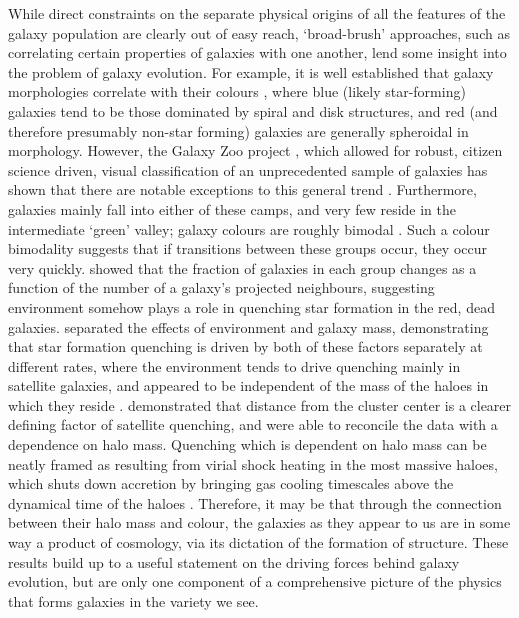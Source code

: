 While direct constraints on the separate physical origins of all the features of the galaxy population are clearly out of easy reach, `broad-brush' approaches, such as correlating certain properties of galaxies with one another, lend some insight into the problem of galaxy evolution. For example, it is well established that galaxy morphologies correlate with their colours \citep[e.g.][]{2001AJ....122.1861S}, where blue (likely star-forming) galaxies tend to be those dominated by spiral and disk structures, and red (and therefore presumably non-star forming) galaxies are generally spheroidal in morphology. However, the Galaxy Zoo project \citep{2008MNRAS.389.1179L,2011MNRAS.410..166L}, which allowed for robust, citizen science driven, visual classification of an unprecedented sample of galaxies has shown that there are notable exceptions to this general trend \citep[ e.g.][]{2009MNRAS.396..818S,2010MNRAS.405..783M}. Furthermore, galaxies mainly fall into either of these camps, and very few reside in the intermediate `green' valley; galaxy colours are roughly bimodal \citep[e.g.][]{2004ApJ...600..681B,2006MNRAS.373..469B}. Such a colour bimodality suggests that if transitions between these groups occur, they occur very quickly. \citet{2006MNRAS.373..469B} showed that the fraction of galaxies in each group changes as a function of the number of a galaxy's projected neighbours, suggesting environment somehow plays a role in quenching star formation in the red, dead galaxies. \citet{2010ApJ...721..193P} separated the effects of environment and galaxy mass, demonstrating that star formation quenching is driven by both of these factors separately at different rates, where the environment tends to drive quenching mainly in satellite galaxies, and appeared to be independent of the mass of the haloes in which they reside \citep{2012ApJ...757....4P}. \citet{2013MNRAS.428.3306W} demonstrated that distance from the cluster center is a clearer defining factor of satellite quenching, and were able to reconcile the data with a dependence on halo mass. Quenching which is dependent on halo mass can be neatly framed as resulting from virial shock heating in the most massive haloes, which shuts down accretion by bringing gas cooling timescales above the dynamical time of the haloes \citep[e.g.][]{2006MNRAS.368....2D,2015MNRAS.447..374G}. Therefore, it may be that through the connection between their halo mass and colour, the galaxies as they appear to us are in some way a product of cosmology, via its dictation of the formation of structure. These results build up to a useful statement on the driving forces behind galaxy evolution, but are only one component of a comprehensive picture of the physics that forms galaxies in the variety we see.


